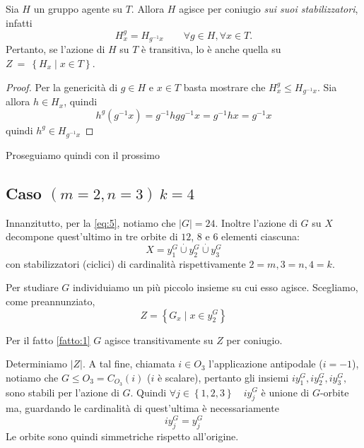 \begin{fatto} \label{fatto:1}
Sia $H$ un gruppo agente su $T$. Allora $H$ agisce per coniugio \emph{sui suoi stabilizzatori}, infatti
\begin{equation} \label{azStab}
H_x^g = H_{g^{-1}x}\qquad\forall g\in H,\forall x\in T.
\end{equation}
Pertanto, se l'azione di $H$ su $T$ \`e transitiva, lo \`e anche quella su $Z~=~\left\{H_x\mid x\in T\right\}$.
\end{fatto}
\begin{proof}
Per la genericit\`a di $g\in H$ e $x\in T$ basta mostrare che $H_x^g\leq H_{g^{-1}x}$. Sia allora $h\in H_x$, quindi
\begin{equation*}
h^g(g^{-1}x) = g^{-1}hgg^{-1}x = g^{-1}hx = g^{-1}x
\end{equation*}
quindi $h^g\in H_{g^{-1}x}$
\end{proof}

Proseguiamo quindi con il prossimo

\subsection{Caso $(m=2, n=3)\ k=4$}
Innanzitutto, per la \ref{eq:5}, notiamo che $\left|G\right|=24$. Inoltre l'azione di $G$ su $X$ decompone quest'ultimo in tre orbite
di $12$, $8$ e $6$ elementi ciascuna:
\begin{equation*}
X = y_1^G\overset{\cdot}\cup y_2^G\overset{\cdot}\cup y_3^G
\end{equation*}
con stabilizzatori (ciclici) di cardinalit\`a rispettivamente $2=m, 3=n, 4=k$.

Per studiare $G$ individuiamo un pi\`u piccolo insieme su cui esso agisce. Scegliamo, come preannunziato,
\begin{equation*}
Z = \left\{ G_x\mid x\in y_2^G\right\}
\end{equation*}

Per il fatto \ref{fatto:1} $G$ agisce transitivamente su $Z$ per coniugio.

Determiniamo $\left|Z\right|$.
A tal fine, chiamata $i\in O_3$ l'applicazione antipodale ($i=-1$), notiamo che $G\leq O_3=C_{O_3}(i)$ ($i$ \`e scalare), pertanto
gli insiemi $iy_1^G,iy_2^G,iy_3^G,$ sono stabili per l'azione di $G$.
Quindi $\forall j\in\left\{1,2,3\right\}\quad iy_j^G$ \`e unione di $G$-orbite ma, guardando le cardinalit\`a di quest'ultima \`e
necessariamente
\begin{equation*}
iy_j^G = y_j^G
\end{equation*}
Le orbite sono quindi simmetriche rispetto all'origine.

